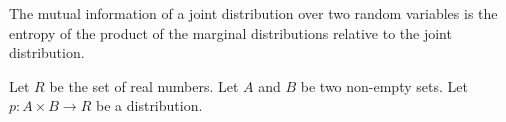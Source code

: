 


The mutual information of
a joint distribution over
two random variables is
the entropy of the product
of the marginal distributions
relative to the joint distribution.


Let $R$ be the set of real
numbers.
Let $A$ and $B$ be
two non-empty sets.
Let $p: A \times B \to R$ be
a distribution.
